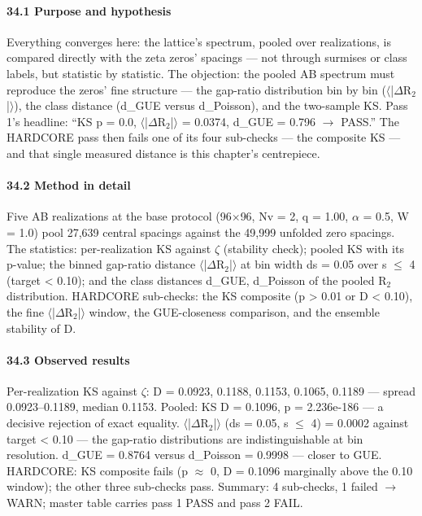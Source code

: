 \documentclass[10pt]{article}
\begin{document}
\paragraph{34.1 Purpose and hypothesis}

Everything converges here: the lattice's spectrum, pooled over realizations, is compared directly with the zeta zeros' spacings --- not through surmises or class labels, but statistic by statistic. The objection: the pooled AB spectrum must reproduce the zeros' fine structure --- the gap-ratio distribution bin by bin ($\langle$|$\Delta$R$_2$|$\rangle$), the class distance (d\_GUE versus d\_Poisson), and the two-sample KS. Pass 1's headline: ``KS p = 0.0, $\langle$|$\Delta$R$_2$|$\rangle$ = 0.0374, d\_GUE = 0.796 $\rightarrow$ PASS.'' The HARDCORE pass then fails one of its four sub-checks --- the composite KS --- and that single measured distance is this chapter's centrepiece.

\paragraph{34.2 Method in detail}

Five AB realizations at the base protocol (96$\times$96, Nv = 2, q = 1.00, $\alpha$ = 0.5, W = 1.0) pool 27,639 central spacings against the 49,999 unfolded zero spacings. The statistics: per-realization KS against $\zeta$ (stability check); pooled KS with its p-value; the binned gap-ratio distance $\langle$|$\Delta$R$_2$|$\rangle$ at bin width ds = 0.05 over s $\le$ 4 (target < 0.10); and the class distances d\_GUE, d\_Poisson of the pooled R$_2$ distribution. HARDCORE sub-checks: the KS composite (p > 0.01 or D < 0.10), the fine $\langle$|$\Delta$R$_2$|$\rangle$ window, the GUE-closeness comparison, and the ensemble stability of D.

\paragraph{34.3 Observed results}

Per-realization KS against $\zeta$: D = 0.0923, 0.1188, 0.1153, 0.1065, 0.1189 --- spread 0.0923--0.1189, median 0.1153. Pooled: KS D = 0.1096, p = 2.236e-186 --- a decisive rejection of exact equality. $\langle$|$\Delta$R$_2$|$\rangle$ (ds = 0.05, s $\le$ 4) = 0.0002 against target < 0.10 --- the gap-ratio distributions are indistinguishable at bin resolution. d\_GUE = 0.8764 versus d\_Poisson = 0.9998 --- closer to GUE. HARDCORE: KS composite fails (p $\approx$ 0, D = 0.1096 marginally above the 0.10 window); the other three sub-checks pass. Summary: 4 sub-checks, 1 failed $\rightarrow$ WARN; master table carries pass 1 PASS and pass 2 FAIL.
\end{document}
